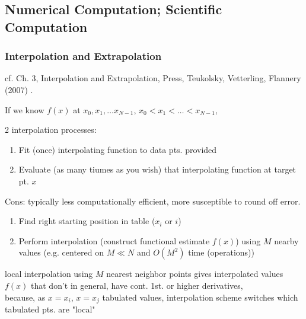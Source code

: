 \documentclass[10pt]{amsart}
\begin{document}
\begin{multicols*}{2}


\part{Numerical Computation; Scientific Computation}

\section{Interpolation and Extrapolation}

cf. Ch. 3, Interpolation and Extrapolation, Press, Teukolsky, Vetterling, Flannery (2007) \cite{PTVF2007}.

If we know $f(x)$ at $x_0, x_1, \dots x_{N-1}$, $x_0 < x_1 < \dots < x_{N-1}$,

2 interpolation processes:
\begin{enumerate}
	\item Fit (once) interpolating function to data pts. provided
	\item Evaluate (as many tiumes as you wish) that interpolating function at target pt. $x$
\end{enumerate}
Cons: typically less computationally efficient, more susceptible to round off error.

\begin{enumerate}
	\item Find right starting position in table ($x_i$ or $i$)
	\item Perform interpolation (construct functional estimate $f(x)$) using $M$ nearby values (e.g. centered on $M \ll N$ and $O(M^2)$ time (operations))
\end{enumerate}

local interpolation using $M$ nearest neighbor points gives interpolated values $f(x)$ that don't in general, have cont. 1st. or higher derivatives, \\
because, as $x= x_i$, $x=x_j$ tabulated values, interpolation scheme switches which tabulated pts. are "local" \\


\end{multicols*}
\end{document}
